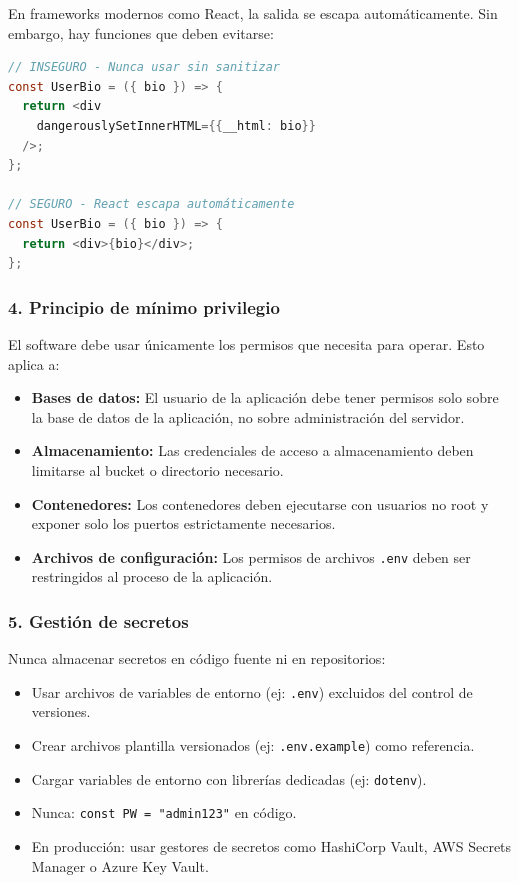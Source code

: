 En frameworks modernos como React, la salida se escapa automáticamente. Sin embargo, hay funciones que deben evitarse:

\begin{lstlisting}[language=Java, caption={Uso inseguro de dangerouslySetInnerHTML}]
// INSEGURO - Nunca usar sin sanitizar
const UserBio = ({ bio }) => {
  return <div
    dangerouslySetInnerHTML={{__html: bio}}
  />;
};

// SEGURO - React escapa automáticamente
const UserBio = ({ bio }) => {
  return <div>{bio}</div>;
};
\end{lstlisting}

\subsubsection{4. Principio de mínimo privilegio}

El software debe usar únicamente los permisos que necesita para operar. Esto aplica a:

\begin{itemize}
    \item \textbf{Bases de datos:} El usuario de la aplicación debe tener permisos solo sobre la base de datos de la aplicación, no sobre administración del servidor.
    \item \textbf{Almacenamiento:} Las credenciales de acceso a almacenamiento deben limitarse al bucket o directorio necesario.
    \item \textbf{Contenedores:} Los contenedores deben ejecutarse con usuarios no root y exponer solo los puertos estrictamente necesarios.
    \item \textbf{Archivos de configuración:} Los permisos de archivos \texttt{.env} deben ser restringidos al proceso de la aplicación.
\end{itemize}

\subsubsection{5. Gestión de secretos}

Nunca almacenar secretos en código fuente ni en repositorios:

\begin{itemize}
    \item Usar archivos de variables de entorno (ej: \texttt{.env}) excluidos del control de versiones.
    \item Crear archivos plantilla versionados (ej: \texttt{.env.example}) como referencia.
    \item Cargar variables de entorno con librerías dedicadas (ej: \texttt{dotenv}).
    \item Nunca: \texttt{const PW = "admin123"} en código.
    \item En producción: usar gestores de secretos como HashiCorp Vault, AWS Secrets Manager o Azure Key Vault.
\end{itemize}

